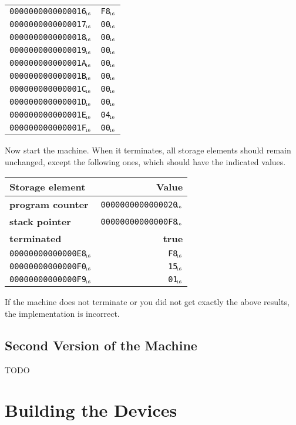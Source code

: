 \documentclass[a4paper,11pt]{article}
\newcommand{\PC}{\textbf{program counter}\xspace}
\newcommand{\SP}{\textbf{stack pointer}\xspace}
\newcommand{\TERM}{\textbf{terminated}\xspace}
\newcommand{\T}{\textbf{true}\xspace}
\newcommand{\num}[1]{\texttt{#1}\xspace}
\newcommand{\hex}[1]{\num{#1}$_{\textup{\tiny\hskip-1ex 16}}$\xspace}
\begin{document}
\begin{center}
\begin{tabular}{@{}ll@{}}
    \hex{0000000000000016} & \hex{F8} \\
    \hex{0000000000000017} & \hex{00} \\
    \hex{0000000000000018} & \hex{00} \\
    \hex{0000000000000019} & \hex{00} \\
    \hex{000000000000001A} & \hex{00} \\
    \hex{000000000000001B} & \hex{00} \\
    \hex{000000000000001C} & \hex{00} \\
    \hex{000000000000001D} & \hex{00} \\
    \hex{000000000000001E} & \hex{04} \\
    \hex{000000000000001F} & \hex{00} \\
    \hline
  \end{tabular}
\end{center}

Now start the machine.
When it terminates, all storage elements should remain unchanged, except the following ones, which should have the indicated values.

\begin{center}
  \begin{tabular}{@{}lr@{}}
    \hline
    Storage element        & Value                   \\
    \hline
    \PC                    & \hex{0000000000000020}  \\
    \SP                    & \hex{00000000000000F8}  \\
    \TERM                  & \T                      \\
    \hex{00000000000000E8} & \hex{F8} \\
    \hex{00000000000000F0} & \hex{15} \\
    \hex{00000000000000F9} & \hex{01} \\
    \hline
  \end{tabular}
\end{center}

If the machine does not terminate or you did not get exactly the above results, the implementation is incorrect.

\subsection{Second Version of the Machine}

TODO

\section{Building the Devices}
\label{sec:building-devices}
\end{document}
